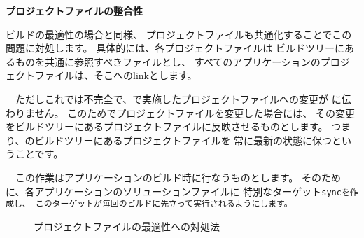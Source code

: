 \medskip
\noindent
\bf{プロジェクトファイルの整合性}
\begin{narrow}[20pt]
	ビルドの最適性の場合と同様、
	プロジェクトファイルも共通化することでこの問題に対処します。
	具体的には、各プロジェクトファイルは
	\SprLib ビルドツリーにあるものを共通に参照すべきファイルとし、
	すべてのアプリケーションのプロジェクトファイルは、そこへのlinkとします。

	　ただしこれでは不完全で、で実施したプロジェクトファイルへの変更が
	に伝わりません。
	このためでプロジェクトファイルを変更した場合には、
	その変更を\SprLib ビルドツリーにあるプロジェクトファイルに反映させるものとします。
	つまり、\SprLib のビルドツリーにあるプロジェクトファイルを
	常に最新の状態に保つということです。

	　この作業はアプリケーションのビルド時に行なうものとします。
	そのために、各アプリケーションのソリューションファイルに
	特別なターゲット\tt{sync}を作成し、
	このターゲットが毎回のビルドに先立って実行されるようにします。

	\begin{figure}[h]
    	\begin{narrow}[40pt]\begin{minipage}{\textwidth}
		{\footnotesize{}}
		\medskip
    	\end{minipage}\end{narrow}
    	\begin{narrow}[40pt]\begin{minipage}{\textwidth}
		{\footnotesize{}}
		\medskip
  	\end{minipage}\end{narrow}
	\caption{プロジェクトファイルの最適性への対処法}
	\label{fig:SolutionToProjectFile}
	\end{figure}
\end{narrow}

